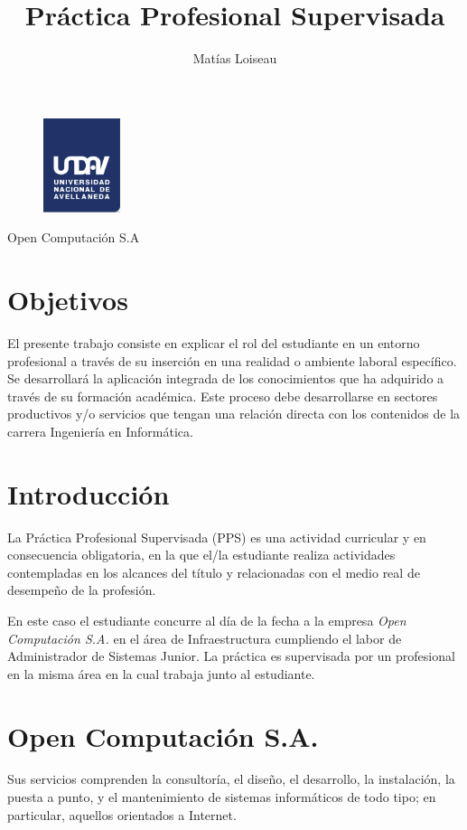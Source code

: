 \documentclass[12pt,a4paper]{article}
\author{Matías Loiseau}
\title{Práctica Profesional Supervisada}
\begin{document}
\begin{figure}
  \centering
   \includegraphics[width=0.2\textwidth]{undav-logo}
  \label{fig:undav-logo}
\end{figure}
\maketitle       %
\begin{center}
Open Computación S.A 
\end{center}
\cleardoublepage

\tableofcontents %
\cleardoublepage

\section{Objetivos}
El presente trabajo consiste en explicar el rol del estudiante en un entorno profesional a través de su inserción en una realidad o ambiente laboral específico. Se desarrollará la aplicación integrada de los conocimientos que ha adquirido a través de su formación académica. Este proceso debe desarrollarse en sectores productivos y/o servicios que tengan una relación directa con los contenidos de la carrera Ingeniería en Informática.

\section{Introducción}
La Práctica Profesional Supervisada (PPS) es una actividad curricular y en consecuencia obligatoria, en la que el/la estudiante realiza actividades contempladas en los alcances del título y relacionadas con el medio real de desempeño de la profesión.

En este caso el estudiante concurre al día de la fecha a la empresa \emph{Open Computación S.A.} en el área de Infraestructura cumpliendo el labor de Administrador de Sistemas Junior. La práctica es supervisada por un profesional en la misma área en la cual trabaja junto al estudiante.

\section{Open Computación S.A.}
Sus servicios comprenden la consultoría, el diseño, el desarrollo, la instalación, la puesta a punto, y el mantenimiento de sistemas informáticos de todo tipo; en particular, aquellos orientados a Internet.
\end{document}
